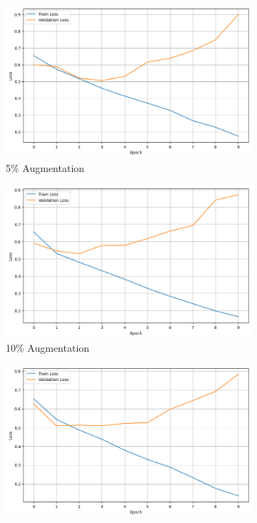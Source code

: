 \documentclass{article}
\begin{document}
\begin{figure}[h]
  \centering
  \begin{subfigure}[b]{0.3\textwidth}
    \includegraphics[width=\textwidth]{img/random_5.png}
    \caption{5\% Augmentation}
    \label{fig:random_5}
  \end{subfigure}
  \hfill
  \begin{subfigure}[b]{0.3\textwidth}
    \includegraphics[width=\textwidth]{img/random_10.png}
    \caption{10\% Augmentation}
    \label{fig:random_10}
  \end{subfigure}
  \hfill
  \begin{subfigure}[b]{0.3\textwidth}
    \includegraphics[width=\textwidth]{img/random_20.png}

\end{subfigure}
\end{figure}
\end{document}
